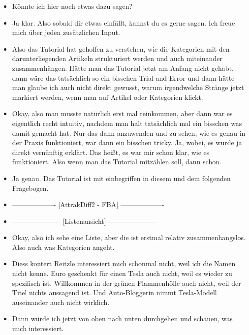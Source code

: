 {\begin{itemize}[]
            \item {} Könnte ich hier noch etwas dazu sagen?
            \item {} Ja klar. Also sobald dir etwas einfällt, kannst du es gerne sagen. Ich freue mich über jeden zusätzlichen Input.
            \item {} Also das Tutorial hat geholfen zu verstehen, wie die Kategorien mit den darunterliegenden Artikeln strukturiert werden und auch miteinander zusammenhängen.
                  Hätte man das Tutorial jetzt am Anfang nicht gehabt, dann wäre das tatsächlich so ein bisschen Trial-and-Error und dann hätte man glaube ich auch nicht direkt gewusst, warum irgendwelche Stränge jetzt markiert werden, wenn man auf Artikel oder Kategorien klickt.
            \item {} Okay, also man musste natürlich erst mal reinkommen, aber dann war es eigentlich recht intuitiv, nachdem man halt tatsächlich mal ein bisschen was damit gemacht hat.
                  Nur das dann anzuwenden und zu sehen, wie es genau in der Praxis funktioniert, war dann ein bisschen tricky.
                  Ja, wobei, es wurde ja direkt vernünftig erklärt.
                  Das heißt, es war mir schon klar, wie es funktioniert.
                  Also wenn man das Tutorial mitzählen soll, dann schon.
            \item {} Ja genau. Das Tutorial ist mit einbegriffen in diesem und dem folgenden Fragebogen.
            \item {-------------------} [AttrakDiff2 - FBA] {-------------------}
            \item {---------------------} [Listenansicht] {---------------------}
            \item {} Okay, also ich sehe eine Liste, aber die ist erstmal relativ zusammenhangslos.
                  Also auch was Kategorien angeht.
            \item {} \flqq Diess kontert Reitzle\frqq{} interessiert mich schonmal nicht, weil ich die Namen nicht kenne.
                   Euro geschenkt für einen Tesla\frqq{} auch nicht, weil es wieder zu spezifisch ist.
                  \flqq Willkommen in der grünen Flammenhölle\frqq{} auch nicht, weil der Titel nichts aussagend ist.
                  Und \flqq Auto-Bloggerin nimmt Tesla-Modell auseinander\frqq{} auch nicht wirklich.
            \item {} Dann würde ich jetzt von oben nach unten durchgehen und schauen, was mich interessiert.

\end{itemize}}
